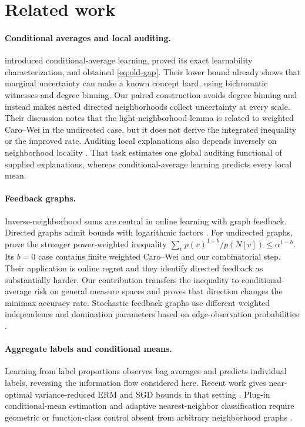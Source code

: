 \documentclass{article}
\newcommand{\1}{\mathbf 1}
\begin{document}
\section{Related work}

\paragraph{Conditional averages and local auditing.}
\citet{bressan2026} introduced conditional-average learning, proved its exact learnability characterization, and obtained \eqref{eq:old-gap}. Their lower bound already shows that marginal uncertainty can make a known concept hard, using bichromatic witnesses and degree binning. Our paired construction avoids degree binning and instead makes nested directed neighborhoods collect uncertainty at every scale. Their discussion notes that the light-neighborhood lemma is related to weighted Caro--Wei in the undirected case, but it does not derive the integrated inequality or the improved rate. Auditing local explanations also depends inversely on neighborhood locality \citep{bhattacharjee2024}. That task estimates one global auditing functional of supplied explanations, whereas conditional-average learning predicts every local mean.

\paragraph{Feedback graphs.}
Inverse-neighborhood sums are central in online learning with graph feedback. Directed graphs admit bounds with logarithmic factors \citep{alon2015}. For undirected graphs, \citet{eldowa2023} prove the stronger power-weighted inequality $\sum_v p(v)^{1+b}/p(N[v])\le\alpha^{1-b}$. Its $b=0$ case contains finite weighted Caro--Wei and our combinatorial step. Their application is online regret and they identify directed feedback as substantially harder. Our contribution transfers the inequality to conditional-average risk on general measure spaces and proves that direction changes the minimax accuracy rate. Stochastic feedback graphs use different weighted independence and domination parameters based on edge-observation probabilities \citep{esposito2022}.

\paragraph{Aggregate labels and conditional means.}
Learning from label proportions observes bag averages and predicts individual labels, reversing the information flow considered here. Recent work gives near-optimal variance-reduced ERM and SGD bounds in that setting \citep{busafekete2025}. Plug-in conditional-mean estimation and adaptive nearest-neighbor classification require geometric or function-class control absent from arbitrary neighborhood graphs \citep{grunewalder2018,balsubramani2019}.
\end{document}

